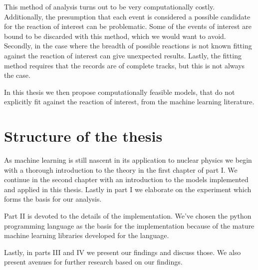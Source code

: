 This method of analysis turns out to be very computationally costly. Additionally, the presumption that each event is considered a possible candidate for the reaction of interest can be problematic. Some of the events of interest are bound to be discarded with this method, which we would want to avoid. Secondly, in the case where the breadth of possible reactions is not known fitting against the reaction of interest can give unexpected results. Lastly, the fitting method requires that the records are of complete tracks, but this is not always the case.

In this thesis we then propose computationally feasible models, that do not explicitly fit against the reaction of interest, from the machine learning literature.

\section{Structure of the thesis}

As machine learning is still nascent in its application to nuclear physics we begin with a thorough introduction to the theory in the first chapter of part I. We continue in the second chapter with an introduction to the models implemented and applied in this thesis. Lastly in part I we elaborate on the experiment which forms the basis for our analysis.

Part II is devoted to the details of the implementation. We've chosen the python programming language as the basis for the implementation because of the mature machine learning libraries developed for the language. 

Lastly, in parts III and IV we present our findings and discuss those. We also present avenues for further research based on our findings.
